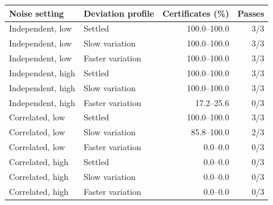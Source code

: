 \begin{tabular}{llrr}\toprule
Noise setting & Deviation profile & Certificates (\%) & Passes \\\midrule
Independent, low & Settled & 100.0--100.0 & 3/3 \\
Independent, low & Slow variation & 100.0--100.0 & 3/3 \\
Independent, low & Faster variation & 100.0--100.0 & 3/3 \\
Independent, high & Settled & 100.0--100.0 & 3/3 \\
Independent, high & Slow variation & 100.0--100.0 & 3/3 \\
Independent, high & Faster variation & 17.2--25.6 & 0/3 \\
Correlated, low & Settled & 100.0--100.0 & 3/3 \\
Correlated, low & Slow variation & 85.8--100.0 & 2/3 \\
Correlated, low & Faster variation & 0.0--0.0 & 0/3 \\
Correlated, high & Settled & 0.0--0.0 & 0/3 \\
Correlated, high & Slow variation & 0.0--0.0 & 0/3 \\
Correlated, high & Faster variation & 0.0--0.0 & 0/3 \\
\bottomrule\end{tabular}
